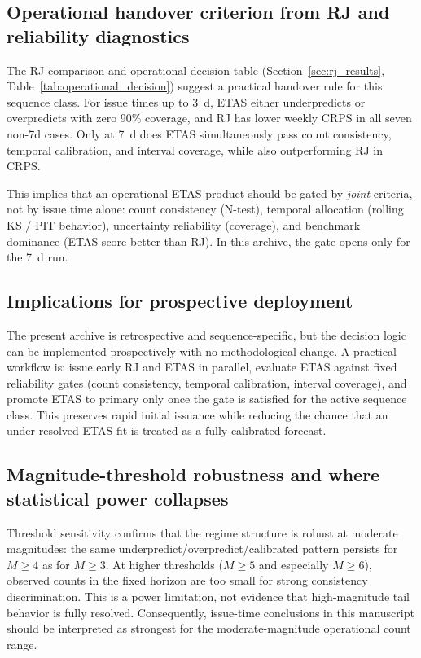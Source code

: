 \documentclass[12pt,letterpaper]{article}
\begin{document}
\subsection{Operational handover criterion from RJ and reliability diagnostics}

The RJ comparison and operational decision table (Section~\ref{sec:rj_results},
Table~\ref{tab:operational_decision}) suggest a practical handover rule for this
sequence class. For issue times up to 3~d, ETAS either underpredicts or
overpredicts with zero 90\% coverage, and RJ has lower weekly CRPS in all seven
non-7d cases. Only at 7~d does ETAS simultaneously pass count consistency,
temporal calibration, and interval coverage, while also outperforming RJ in CRPS.

This implies that an operational ETAS product should be gated by \emph{joint}
criteria, not by issue time alone: count consistency (N-test), temporal
allocation (rolling KS / PIT behavior), uncertainty reliability (coverage), and
benchmark dominance (ETAS score better than RJ). In this archive, the gate opens
only for the 7~d run.

\subsection{Implications for prospective deployment}

The present archive is retrospective and sequence-specific, but the decision
logic can be implemented prospectively with no methodological change. A practical
workflow is: issue early RJ and ETAS in parallel, evaluate ETAS against fixed
reliability gates (count consistency, temporal calibration, interval coverage),
and promote ETAS to primary only once the gate is satisfied for the active
sequence class. This preserves rapid initial issuance while reducing the chance
that an under-resolved ETAS fit is treated as a fully calibrated forecast.

\subsection{Magnitude-threshold robustness and where statistical power collapses}

Threshold sensitivity confirms that the regime structure is robust at
moderate magnitudes: the same underpredict/overpredict/calibrated pattern
persists for $M\geq4$ as for $M\geq3$.
At higher thresholds ($M\geq5$ and especially $M\geq6$), observed counts in the
fixed horizon are too small for strong consistency discrimination. This is a
power limitation, not evidence that high-magnitude tail behavior is fully
resolved. Consequently, issue-time conclusions in this manuscript should be
interpreted as strongest for the moderate-magnitude operational count range.
\end{document}
